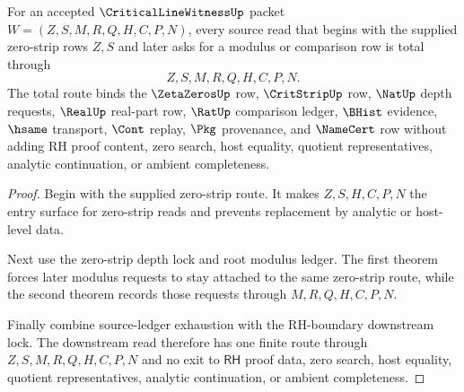 \begin{theorem}
\label{thm:critical-line-witness-zero-strip-modulus-source-totality}
For an accepted $\CriticalLineWitnessUp$ packet $W=(Z,S,M,R,Q,H,C,P,N)$, every source read that begins with the supplied zero-strip rows $Z,S$ and later asks for a modulus or comparison row is total through
$$
Z,S,M,R,Q,H,C,P,N.
$$
The total route binds the $\ZetaZerosUp$ row, $\CritStripUp$ row, $\NatUp$ depth requests, $\RealUp$ real-part row, $\RatUp$ comparison ledger, $\BHist$ evidence, $\hsame$ transport, $\Cont$ replay, $\Pkg$ provenance, and $\NameCert$ row without adding RH proof content, zero search, host equality, quotient representatives, analytic continuation, or ambient completeness.
\end{theorem}
\begin{proof}
Begin with the supplied zero-strip route. It makes $Z,S,H,C,P,N$ the entry surface for zero-strip reads and prevents replacement by analytic or host-level data.

Next use the zero-strip depth lock and root modulus ledger. The first theorem forces later modulus requests to stay attached to the same zero-strip route, while the second theorem records those requests through $M,R,Q,H,C,P,N$.

Finally combine source-ledger exhaustion with the RH-boundary downstream lock. The downstream read therefore has one finite route through $Z,S,M,R,Q,H,C,P,N$ and no exit to $\mathsf{RH}$ proof data, zero search, host equality, quotient representatives, analytic continuation, or ambient completeness.
\end{proof}
